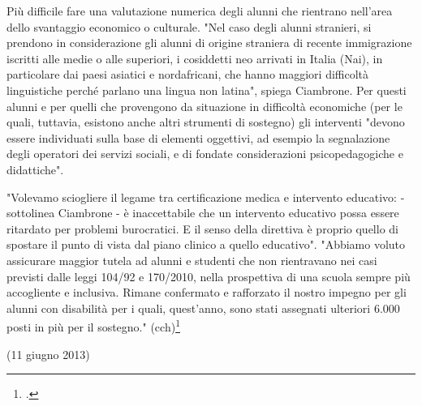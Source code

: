 Più difficile fare una valutazione numerica degli alunni che rientrano nell'area dello svantaggio economico o culturale. "Nel caso degli alunni stranieri, si prendono in considerazione gli alunni di origine straniera di recente immigrazione iscritti alle medie o alle superiori, i cosiddetti neo arrivati in Italia (Nai), in particolare dai paesi asiatici e nordafricani, che hanno maggiori difficoltà linguistiche perché parlano una lingua non latina", spiega Ciambrone. Per questi alunni e per quelli che provengono da situazione in difficoltà economiche (per le quali, tuttavia, esistono anche altri strumenti di sostegno) gli interventi "devono essere individuati sulla base di elementi oggettivi, ad esempio la segnalazione degli operatori dei servizi sociali, e di fondate considerazioni psicopedagogiche e didattiche".

"Volevamo sciogliere il legame tra certificazione medica e intervento educativo: - sottolinea Ciambrone - è inaccettabile che un intervento educativo possa essere ritardato per problemi burocratici. E il senso della direttiva è proprio quello di spostare il punto di vista dal piano clinico a quello educativo". "Abbiamo voluto assicurare maggior tutela ad alunni e studenti che non rientravano nei casi previsti dalle leggi 104/92 e 170/2010, nella prospettiva di una scuola sempre più accogliente e inclusiva. Rimane confermato e rafforzato il nostro impegno per gli alunni con disabilità per i quali, quest'anno, sono stati assegnati ulteriori 6.000 posti in più per il sostegno." (cch)\footcite{SuperAbile2013}

(11 giugno 2013)
